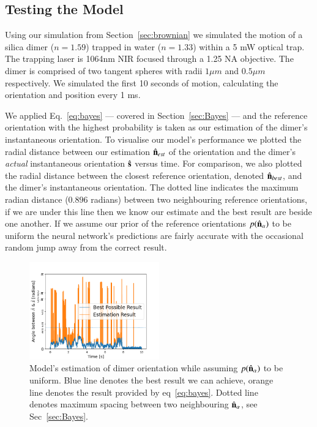 \documentclass[final,  3p]{elsarticle}
\begin{document}
\subsection{Testing the Model}
\label{sec:test}

Using our simulation from Section~\ref{sec:brownian} we simulated the motion of a silica dimer ($n = 1.59$) trapped in water ($n = 1.33$) within a 5 mW optical trap. The trapping laser is 1064nm NIR focused through a 1.25 NA objective. The dimer is comprised of two tangent spheres with radii $1 \mu m$ and $0.5 \mu m$ respectively. We simulated the first 10 seconds of motion, calculating the orientation and position every 1 ms. 

We applied Eq.~\eqref{eq:bayes} --- covered in Section~\ref{sec:Bayes} --- and the reference orientation with the highest probability is taken as our estimation of the dimer's instantaneous orientation. To visualise our model's performance  we plotted the radial distance between our estimation $\hat{\bf n}_{est}$ of the orientation and the dimer's \emph{actual} instantaneous orientation $\hat{\bf s}$ versus time. For comparison, we also plotted the radial distance between the closest reference orientation, denoted $\hat{\bf n}_{best}$, and the dimer's instantaneous orientation. The dotted line indicates the maximum radian distance ($0.896$ radians) between two neighbouring reference orientations, if we are under this line then we know our estimate and the best result are beside one another. If we assume our prior of the reference orientations $p(\hat{\bf n}_\alpha)$ to be uniform the neural network's predictions are fairly accurate with the occasional random jump away from the correct result. 

\begin{figure}[h]
	\centering
	\includegraphics[width=0.5\textwidth]{./Images/fig3.png}
	\caption{Model's estimation of dimer orientation while assuming $p(\hat{\bf n}_\alpha)$ to be uniform. Blue line denotes the best result we can achieve, orange line denotes the result provided by eq~\ref{eq:bayes}. Dotted line denotes maximum spacing between two neighbouring $\hat{\bf n}_\alpha$, see Sec~\ref{sec:Bayes}.}
	\label{fig:uniform}
\end{figure} 
\end{document}

